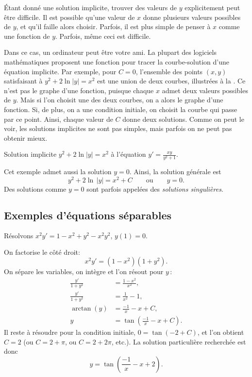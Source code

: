 Étant donné une solution implicite, trouver des valeurs de $y$ explicitement peut être difficile.  Il est possible qu'une valeur de $x$ donne plusieurs valeurs possibles de $y$, et qu'il faille alors choisir.  Parfois, il est plus simple de penser à $x$ comme une fonction de $y$.  Parfois, même ceci est difficile.

Dans ce cas, un ordinateur peut être votre ami.  La plupart des logiciels mathématiques proposent une fonction pour tracer la courbe-solution d'une équation implicite.  Par exemple, pour $C=0$, l'ensemble des points $(x,y)$ satisfaisant à $y^2+2\ln|y|=x^2$ 
est une union de deux courbes, illustrées à la .  Ce n'est pas le graphe d'une fonction, puisque chaque $x$ admet deux valeurs possibles de $y$.  Mais si l'on choisit une des deux courbes, on a alors le graphe d'une fonction.  Si, de plus, on a une condition initiale, on choisit la courbe qui passe par ce point.  Ainsi, chaque valeur de $C$ donne deux solutions.  Comme on peut le voir, les solutions implicites ne sont pas simples, mais parfois on ne peut pas obtenir mieux.

\begin{myfig}
\capstart
{}
\caption{Solution implicite $y^2+2\ln|y|=x^2$ à l'équation $y'=\frac{xy}{y^2+1}$.\label{implicitsols:fig}}
\end{myfig}

Cet exemple admet aussi la solution $y=0$.
Ainsi, la solution générale est 
\begin{equation*}
	y^2 + 2 \ln \, \lvert y \rvert = x^2 + C \qquad \text{ou} \qquad y=0.
\end{equation*}
Des solutions comme $y=0$
sont parfois appelées des \emph{solutions singulières}.

\subsection{Exemples d'équations séparables}

\begin{example}
Résolvons $x^2y' = 1 - x^2+y^2 - x^2y^2$, $y(1) = 0$.

On factorise le côté droit: 
\begin{equation*}
x^2y' = (1 - x^2)(1+y^2).
\end{equation*}
On sépare les variables, on intègre et l'on résout pour $y$\,: 
\begin{align*}
\frac{y'}{1+y^2} & = \frac{1 - x^2}{x^2} , \\
\frac{y'}{1+y^2} & = \frac{1}{x^2} - 1 , \\
\operatorname{arctan} (y) & = \frac{-1}{x} - x + C , \\
y & = \tan \left(\frac{-1}{x} - x + C\right) .
\end{align*}
Il reste à résoudre pour la condition initiale,
 $0 = \tan(-2+C)$, et l'on obtient $C=2$ (ou $C = 2 +
\pi$, ou $C = 2 + 2\pi$, etc.).  La solution particulière recherchée est donc
\begin{equation*}
y = \tan \left(\frac{-1}{x} - x + 2 \right) .
\end{equation*}
\end{example}

